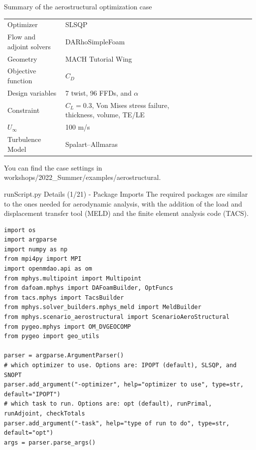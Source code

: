 \documentclass{bredelebeamer}
\begin{document}
\begin{frame}{Summary of the aerostructural optimization case}

  \begin{table}
    \renewcommand{\arraystretch}{1.5}
    \small
    \centering
    \label{tab:implemented_models}
    \begin{tabular}{llllllllllll}
    \hline
    Optimizer   & SLSQP \\
    Flow and adjoint solvers  & DARhoSimpleFoam  \\
    Geometry  & MACH Tutorial Wing \\
    Objective function  & $C_D$ \\
    Design variables &7 twist, 96 FFDs, and $\alpha$ \\
    Constraint & \makecell[l]{$C_L=0.3$, Von Mises stress failure, thickness,\\volume, TE/LE}\\
    $U_\infty$  & 100 m/s \\
    Turbulence Model  & Spalart--Allmaras\\
     \hline
    \end{tabular}
  \end{table}

  You can find the case settings in workshops/2022\_Summer/examples/aerostructural.
\end{frame}

\begin{frame}[fragile]{runScript.py Details (1/21) - \large Package Imports}
The required packages are similar to the ones needed for aerodynamic analysis, with the addition of the load and displacement transfer tool (MELD) and the finite element analysis code (TACS).
\scriptsize
\lstset{ language=bash }
\begin{lstlisting}
import os
import argparse
import numpy as np
from mpi4py import MPI
import openmdao.api as om
from mphys.multipoint import Multipoint
from dafoam.mphys import DAFoamBuilder, OptFuncs
from tacs.mphys import TacsBuilder
from mphys.solver_builders.mphys_meld import MeldBuilder
from mphys.scenario_aerostructural import ScenarioAeroStructural
from pygeo.mphys import OM_DVGEOCOMP
from pygeo import geo_utils

parser = argparse.ArgumentParser()
# which optimizer to use. Options are: IPOPT (default), SLSQP, and SNOPT
parser.add_argument("-optimizer", help="optimizer to use", type=str, default="IPOPT")
# which task to run. Options are: opt (default), runPrimal, runAdjoint, checkTotals
parser.add_argument("-task", help="type of run to do", type=str, default="opt")
args = parser.parse_args()
\end{lstlisting}
\normalsize
\end{frame}
\end{document}
